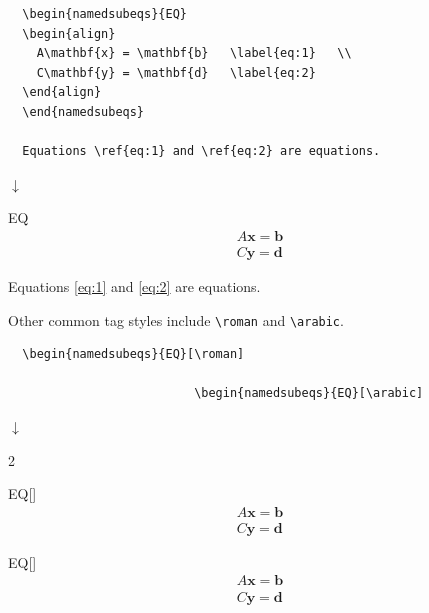 \documentclass{article}
\begin{document}
\begin{tcolorbox}
  \begin{verbatim}
  \begin{namedsubeqs}{EQ}
  \begin{align}
    A\mathbf{x} = \mathbf{b}   \label{eq:1}   \\
    C\mathbf{y} = \mathbf{d}   \label{eq:2}
  \end{align}
  \end{namedsubeqs}
  
  Equations \ref{eq:1} and \ref{eq:2} are equations.
  \end{verbatim}
\begin{center}$\downarrow$\end{center}
    \begin{namedsubeqs}{EQ}
    \begin{align}
      A\mathbf{x} = \mathbf{b}   \label{eq:1}   \\
      C\mathbf{y} = \mathbf{d}   \label{eq:2}
    \end{align}
    \end{namedsubeqs}
    Equations \ref{eq:1} and \ref{eq:2} are equations.
\end{tcolorbox}


Other common tag styles include \verb|\roman| and \verb|\arabic|.
\begin{tcolorbox}
  \begin{verbatim}
  \begin{namedsubeqs}{EQ}[\roman]
  
                          \begin{namedsubeqs}{EQ}[\arabic]
  \end{verbatim}
\begin{center}$\downarrow$\end{center}
\VTrg
\begin{multicols}{2}
    \begin{namedsubeqs}{EQ}[\roman]
    \begin{align}
      A\mathbf{x} = \mathbf{b}   \\
      C\mathbf{y} = \mathbf{d}
    \end{align}
    \end{namedsubeqs}
    \begin{namedsubeqs}{EQ}[\arabic]
    \begin{align}
      A\mathbf{x} = \mathbf{b}   \\
      C\mathbf{y} = \mathbf{d}
    \end{align}
    \end{namedsubeqs}
  \end{multicols}
\end{tcolorbox}
\end{document}
